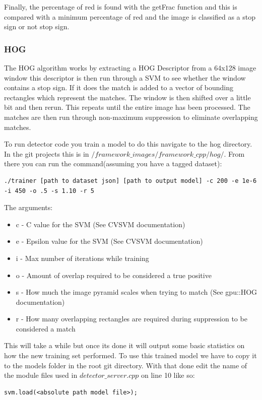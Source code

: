 \documentclass[letterpaper,10pt,titlepage]{article}
\begin{document}
Finally, the percentage of red is found with the getFrac function and this is
compared with a minimum percentage of red and the image is classified as a 
stop sign or not stop sign. 

\subsubsection*{HOG}
The HOG algorithm works by extracting a HOG Descriptor from a 64x128 image window
this descriptor is then run through a SVM to see whether the window contains a 
stop sign. If it does the match is added to a vector of bounding rectangles which
represent the matches. The window is then shifted over a little bit and then rerun.
This repeats until the entire image has been processed. The matches are then run 
through non-maximum suppression to eliminate overlapping matches.

To run detector code you train a model to do this navigate to the hog directory. In
the git projects this is in $/framework\_images/framework\_cpp/hog/$. From there you can
run the command(assuming you have a tagged dataset):
\begin{lstlisting}
./trainer [path to dataset json] [path to output model] -c 200 -e 1e-6 -i 450 -o .5 -s 1.10 -r 5
\end{lstlisting}
The arguments:
\begin{itemize}
    \item c - C value for the SVM (See CVSVM documentation)
    \item e - Epsilon value for the SVM (See CVSVM documentation)
    \item i - Max number of iterations while training
    \item o - Amount of overlap required to be considered a true positive
    \item s - How much the image pyramid scales when trying to match (See gpu::HOG documentation)
    \item r - How many overlapping rectangles are required during suppression to be considered a match
\end{itemize}

This will take a while but once its done it will output some basic statistics 
on how the new training set performed. To use this trained model we have to copy it
to the models folder in the root git directory. With that done edit the name of the
module files used in $detector\_server.cpp$ on line 10 like so:
\begin{lstlisting}
svm.load(<absolute path model file>); 
\end{lstlisting}
\end{document}
